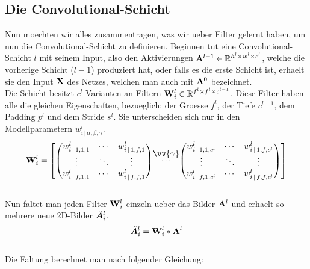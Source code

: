 \subsection{Die Convolutional-Schicht}
Nun moechten wir alles zusammentragen, was wir ueber Filter gelernt
haben, um nun die Convolutional-Schicht zu definieren.
\para{}
Beginnen tut eine Convolutional-Schicht $l$ mit seinem Input, also den
Aktivierungen $\mathbf{A}^{l-1} \in \mathbb{R}^{h^l \times w^l \times c^l}$, welche die vorherige Schicht ($l-1$) produziert hat,
oder falls es die erste Schicht ist, erhaelt sie den Input $\mathbf{X}$ des Netzes,
welchen man auch mit $\mathbf{A}^0$ bezeichnet. \\
Die Schicht besitzt $c^l$ Varianten an Filtern $\mathbf{W}^l_i \in
\mathbb{R}^{f^l \times f^l \times c^{l-1}}$. Diese Filter haben alle die gleichen
Eigenschaften, bezueglich: der Groesse $f^l$, der Tiefe $c^{l-1}$, dem Padding
$p^l$ und dem Stride $s^l$. Sie unterscheiden sich nur in den Modellparametern
$w^l_{i\,|\,\alpha,\beta,\gamma}$.
\\
\begin{equation*}
  \ten{W}^l_i =
  \begin{bmatrix}
    \begin{pmatrix}
      w_{i\,|\,1,1,1}^l & \cdots & w_{i\,|\,1,f,1}^l \\
      \vdots & \ddots & \vdots \\
      w_{i\,|\,f,1,1}^l & \cdots & w_{i\,|\,f,f,1}^l
    \end{pmatrix}
    & \stackrel{\mathclap{\normalfont\mbox{$\vv{\gamma}$}}}{\cdots} &
    \begin{pmatrix}
      w_{i\,|\,1,1,c^l}^l & \cdots & w_{i\,|\,1,f,c^l}^l \\
      \vdots & \ddots & \vdots \\
      w_{i\,|\,f,1,c^l}^l & \cdots & w_{i\,|\,f,f,c^l}^l
    \end{pmatrix}
  \end{bmatrix}
\end{equation*}
\\
Nun faltet man jeden Filter $\mathbf{W}_i^l$ einzeln ueber das Bilder
$\mathbf{A}^l$ und erhaelt so mehrere neue 2D-Bilder $\tilde{\bm{A}}_i^l$.
\\
\begin{equation}
  \tilde{\bm{A}}_i^l = \mathbf{W}_i^l * \mathbf{A}^l
\end{equation}
\\
Die Faltung berechnet man nach folgender Gleichung:
\\
